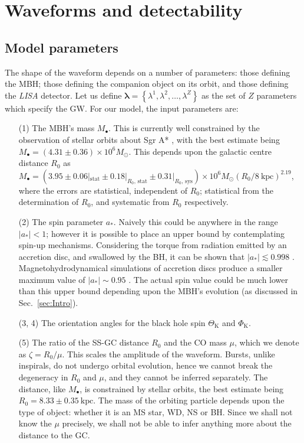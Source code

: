 \documentclass[useAMS,usedcolumn,usegraphicx,usenatbib]{mn2e}
\newcommand{\secref}[1]{Sec.~\ref{sec:#1}}
\newcommand{\units}[1]{\ensuremath{~\mathrm{#1}}}
\newcommand{\sub}[1]{\ensuremath{_\mathrm{#1}}}
\begin{document}
\section{Waveforms and detectability}\label{sec:Waveforms}

\subsection{Model parameters}

The shape of the waveform depends on a number of parameters: those defining the MBH; those defining the companion object on its orbit, and those defining the \textit{LISA} detector. Let us define $\boldsymbol{\lambda} = \left\{\lambda^1, \lambda^2, \ldots, \lambda^Z\right\}$ as the set of $Z$ parameters which specify the GW. For our model, the input parameters are:
\begin{enumerate}
\item[(1)] The MBH's mass $M_\bullet$. This is currently well constrained by the observation of stellar orbits about Sgr A* \citep{Ghez2008, Gillessen2009}, with the best estimate being $M_\bullet = (4.31 \pm 0.36) \times 10^6 M_\odot$. This depends upon the galactic centre distance $R_0$ as $M_\bullet = (3.95 \pm 0.06|\sub{stat} \pm 0.18|_{R_0, \, \mathrm{stat}} \pm  0.31|_{R_0, \, \mathrm{sys}}) \times 10^6 M_\odot (R_0 / 8\units{kpc})^{2.19}$, where the errors are statistical, independent of $R_0$; statistical from the determination of $R_0$, and systematic from $R_0$ respectively.
\item[(2)] The spin parameter $a_\ast$. Naively this could be anywhere in the range $|a_\ast| < 1$; however it is possible to place an upper bound by contemplating spin-up mechanisms. Considering the torque from radiation emitted by an accretion disc, and swallowed by the BH, it can be shown that $|a_\ast| \lesssim 0.998$ \citep{Thorne1974}. Magnetohydrodynamical simulations of accretion discs produce a smaller maximum value of $|a_\ast| \sim 0.95$ \citep{Gammie2004}. The actual spin value could be much lower than this upper bound depending upon the MBH's evolution (as discussed in \secref{Intro}).
\item[(3, 4)] The orientation angles for the black hole spin $\Theta\sub{K}$ and $\Phi\sub{K}$.
\item[(5)] The ratio of the SS-GC distance $R_0$ and the CO mass $\mu$, which we denote as $\zeta = R_0/\mu$. This scales the amplitude of the waveform. Bursts, unlike inspirals, do not undergo orbital evolution, hence we cannot break the degeneracy in $R_0$ and $\mu$, and they cannot be inferred separately. The distance, like $M_\bullet$, is constrained by stellar orbits, the best estimate being \citep{Gillessen2009} $R_0 = 8.33 \pm 0.35\units{kpc}$. The mass of the orbiting particle depends upon the type of object: whether it is an MS star, WD, NS or BH. Since we shall not know the $\mu$ precisely, we shall not be able to infer anything more about the distance to the GC.

\end{enumerate}
\end{document}
